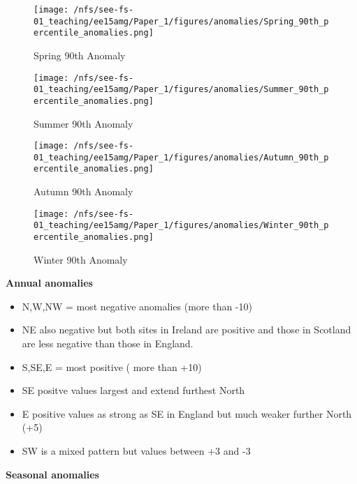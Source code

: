 \documentclass[10pt]{article}
\begin{document}
\begin{figure}
	\texttt{[image: /nfs/see-fs-01\_teaching/ee15amg/Paper\_1/figures/anomalies/Spring\_90th\_percentile\_anomalies.png]}
	\caption{Spring 90th Anomaly}
\end{figure}


\begin{figure}
	\texttt{[image: /nfs/see-fs-01\_teaching/ee15amg/Paper\_1/figures/anomalies/Summer\_90th\_percentile\_anomalies.png]}
	\caption{Summer 90th Anomaly}
\end{figure}

\begin{figure}
	\texttt{[image: /nfs/see-fs-01\_teaching/ee15amg/Paper\_1/figures/anomalies/Autumn\_90th\_percentile\_anomalies.png]}
	\caption{Autumn 90th Anomaly}
\end{figure}

\begin{figure}
	\texttt{[image: /nfs/see-fs-01\_teaching/ee15amg/Paper\_1/figures/anomalies/Winter\_90th\_percentile\_anomalies.png]}
	\caption{Winter 90th Anomaly}
\end{figure}


\textbf{Annual anomalies}

\begin{itemize}
\item  N,W,NW = most negative anomalies (more than -10)
\item NE also negative but both sites in Ireland are positive and those in Scotland are less negative than those in England. 
\item S,SE,E = most positive ( more than +10) 
\item SE positve values largest and extend furthest North 
\item E positive values as strong as SE in England but much weaker further North (+5)
\item SW is a mixed pattern but values between +3 and -3 
\end{itemize}


\textbf{Seasonal anomalies}
\end{document}
